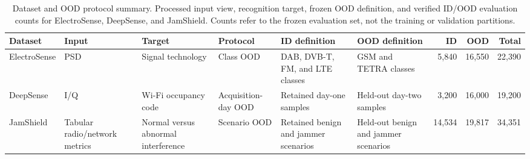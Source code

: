 \begin{table}[!t]
  \caption{Dataset and OOD protocol summary. Processed input view, recognition target, frozen OOD definition, and verified ID/OOD evaluation counts for ElectroSense, DeepSense, and JamShield. Counts refer to the frozen evaluation set, not the training or validation partitions.}
  \label{tab:dataset-protocols}
  \centering
  \scriptsize
  \setlength{\tabcolsep}{3pt}
  \renewcommand{\arraystretch}{1.12}
  \begin{tabularx}{\textwidth}{@{}l l l l Y Y r r r@{}}
    \toprule
    Dataset & Input & Target & Protocol & ID definition & OOD definition & ID & OOD & Total \\
    \midrule
    ElectroSense & PSD & Signal technology & Class OOD &
      DAB, DVB-T, FM, and LTE classes &
      GSM and TETRA classes &
      5,840 & 16,550 & 22,390 \\
    DeepSense & I/Q & Wi-Fi occupancy code & Acquisition-day OOD &
      Retained day-one samples &
      Held-out day-two samples &
      3,200 & 16,000 & 19,200 \\
    JamShield & Tabular radio/network metrics & Normal versus abnormal interference & Scenario OOD &
      Retained benign and jammer scenarios &
      Held-out benign and jammer scenarios &
      14,534 & 19,817 & 34,351 \\
    \bottomrule
  \end{tabularx}
\end{table}
